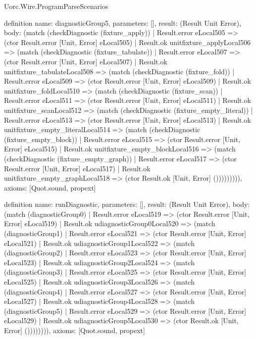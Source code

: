 \begin{lexlean}{Uorc.Wire.ProgramParseScenarios}
\begin{semanticmodule}
definition{
  name: diagnosticGroup5,
  parameters: [],
  result: (Result Unit Error),
  body: (match (checkDiagnostic (fixture_apply))
    | Result.error eLocal505 => (ctor Result.error [Unit, Error] eLocal505)
    | Result.ok unitfixture_applyLocal506 => (match (checkDiagnostic (fixture_tabulate))
      | Result.error eLocal507 => (ctor Result.error [Unit, Error] eLocal507)
      | Result.ok unitfixture_tabulateLocal508 => (match (checkDiagnostic (fixture_fold))
        | Result.error eLocal509 => (ctor Result.error [Unit, Error] eLocal509)
        | Result.ok unitfixture_foldLocal510 => (match (checkDiagnostic (fixture_scan))
          | Result.error eLocal511 => (ctor Result.error [Unit, Error] eLocal511)
          | Result.ok unitfixture_scanLocal512 => (match (checkDiagnostic (fixture_empty_literal))
            | Result.error eLocal513 => (ctor Result.error [Unit, Error] eLocal513)
            | Result.ok unitfixture_empty_literalLocal514 => (match (checkDiagnostic (fixture_empty_block))
              | Result.error eLocal515 => (ctor Result.error [Unit, Error] eLocal515)
              | Result.ok unitfixture_empty_blockLocal516 => (match (checkDiagnostic (fixture_empty_graph))
                | Result.error eLocal517 => (ctor Result.error [Unit, Error] eLocal517)
                | Result.ok unitfixture_empty_graphLocal518 => (ctor Result.ok [Unit, Error] ())))))))),
  axioms: [Quot.sound, propext]
}

definition{
  name: runDiagnostic,
  parameters: [],
  result: (Result Unit Error),
  body: (match (diagnosticGroup0)
    | Result.error eLocal519 => (ctor Result.error [Unit, Error] eLocal519)
    | Result.ok udiagnosticGroup0Local520 => (match (diagnosticGroup1)
      | Result.error eLocal521 => (ctor Result.error [Unit, Error] eLocal521)
      | Result.ok udiagnosticGroup1Local522 => (match (diagnosticGroup2)
        | Result.error eLocal523 => (ctor Result.error [Unit, Error] eLocal523)
        | Result.ok udiagnosticGroup2Local524 => (match (diagnosticGroup3)
          | Result.error eLocal525 => (ctor Result.error [Unit, Error] eLocal525)
          | Result.ok udiagnosticGroup3Local526 => (match (diagnosticGroup4)
            | Result.error eLocal527 => (ctor Result.error [Unit, Error] eLocal527)
            | Result.ok udiagnosticGroup4Local528 => (match (diagnosticGroup5)
              | Result.error eLocal529 => (ctor Result.error [Unit, Error] eLocal529)
              | Result.ok udiagnosticGroup5Local530 => (ctor Result.ok [Unit, Error] ()))))))),
  axioms: [Quot.sound, propext]
}


\end{semanticmodule}
\end{lexlean}
